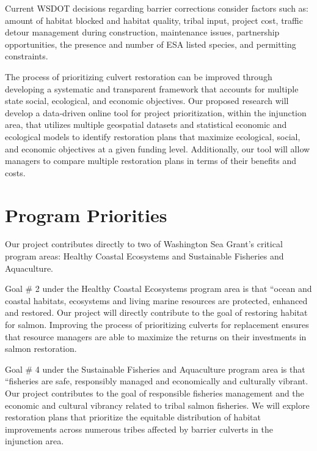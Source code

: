 \documentclass[12pt]{elsarticle}
\begin{document}
Current WSDOT decisions regarding barrier corrections consider factors such as: amount of habitat blocked and habitat quality, tribal input, project cost, traffic detour management during construction, maintenance issues, partnership opportunities, the presence and number of ESA listed species, and permitting constraints. %

The process of prioritizing culvert restoration can be improved through developing a systematic and transparent framework that accounts for multiple state social, ecological, and economic objectives. Our proposed research will develop a data-driven online tool for project prioritization, within the injunction area, that utilizes multiple geospatial datasets and statistical economic and ecological models to identify restoration plans that maximize ecological, social, and economic objectives at a given funding level. Additionally, our tool will allow managers to compare multiple restoration plans in terms of their benefits and costs.

\section{Program Priorities} %


Our project contributes directly to two of Washington Sea Grant's critical program areas: Healthy Coastal Ecosystems and Sustainable Fisheries and Aquaculture. 

Goal \# 2 under the Healthy Coastal Ecosystems program area is that ``ocean and coastal habitats, ecosystems and living marine resources are protected, enhanced and restored. Our project will directly contribute to the goal of restoring habitat for salmon. Improving the process of prioritizing culverts for replacement ensures that resource managers are able to maximize the returns on their investments in salmon restoration.

Goal \# 4 under the Sustainable Fisheries and Aquaculture program area is that ``fisheries are safe, responsibly managed and economically and culturally vibrant. Our project contributes to the goal of responsible fisheries management and the economic and cultural vibrancy related to tribal salmon fisheries. We will explore restoration plans that prioritize the equitable distribution of habitat improvements across numerous tribes affected by barrier culverts in the injunction area. 
\end{document}
